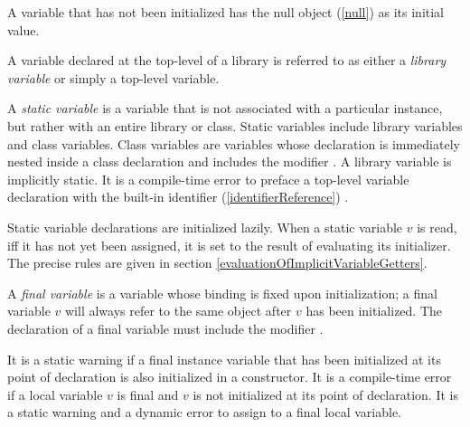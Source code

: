 \documentclass{article}
\begin{document}
\LMHash{}
A variable that has not been initialized has the null object (\ref{null}) as its initial value.

\LMHash{}
A variable declared at the top-level of a library is referred to as either a {\em library variable} or simply a top-level variable.

\LMHash{}
A {\em static variable} is a variable that is not associated with a particular instance, but rather with an entire library or class.  Static variables include library variables and class variables. Class variables are variables whose declaration is immediately nested inside a class declaration and includes the modifier \STATIC{}. A library variable is implicitly static. It is a compile-time error to preface a top-level variable declaration with the built-in identifier  (\ref{identifierReference}) \STATIC{}.

\LMHash{}
Static variable declarations are initialized lazily. When a static variable $v$ is read, iff it has not yet been assigned,  it is set to the result of evaluating its initializer. The precise rules are given in section \ref{evaluationOfImplicitVariableGetters}.


\LMHash{}
A {\em final variable} is a variable whose binding is fixed upon initialization; a final variable $v$ will always refer to the same object after $v$ has been initialized. The declaration of a final variable must  include the modifier \FINAL{}.

\LMHash{}
It is a static warning if a final instance variable that has been initialized at its point of declaration  is  also initialized in a constructor.
It is a compile-time error if a local variable $v$ is final and $v$ is not initialized at its point of declaration.
It is a static warning and a dynamic error to assign to a final local variable.

\end{document}
